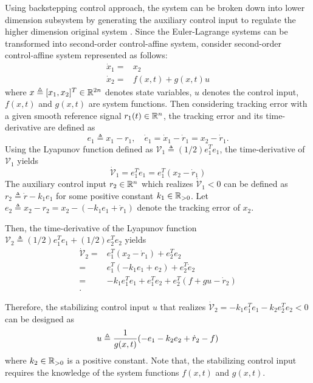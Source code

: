 Using backstepping control approach, the system can be broken down into lower dimension subsystem by generating the auxiliary control input to regulate the higher dimension original system \cite{RN7}.
Since the Euler-Lagrange systems can be transformed into second-order control-affine system, consider second-order control-affine system represented as follows:
\begin{equation}
  \begin{aligned}
    \dot x_1 =& x_2\\
    \dot x_2 =& f(x,t)+g(x,t)u
  \end{aligned}
\end{equation}
where $x\triangleq [x_1,x_2]^T\in\mathbb{R}^{2n}$ denotes state variables, $u$ denotes the control input, $f(x,t)$ and $g(x,t)$ are system functions.
Then considering tracking error with a given smooth reference signal $r_1(t)\in\mathbb{R}^n$, the tracking error and its time-derivative are defined as
\begin{equation}
  e_1\triangleq x_1-r_1,\quad \dot e_1= \dot x_1-\dot r_1=x_2-\dot r_1
  .
\end{equation}
Using the Lyapunov function defined as $\mathcal V_1\triangleq (1/2)e_1^Te_1$, the time-derivative of $\mathcal V_1$ yields
\begin{equation}
  \dot {\mathcal V}_1 =e_1^T\dot e_1=e_1^T(x_2-\dot r_1)
\end{equation}
The auxiliary control input $r_2\in\mathbb{R}^n$ which realizes $\dot{\mathcal V}_1<0$ can be defined as $r_2\triangleq \dot r -k_1e_1$ for some positive constant $k_1\in\mathbb{R}_{>0}$.
Let $e_2\triangleq x_2-r_2=x_2-(-k_1e_1+\dot r_1)$ denote the tracking error of $x_2$.

Then, the time-derivative of the Lyapunov function $\mathcal V_2\triangleq (1/2)e_1^Te_1+(1/2)e_2^Te_2$ yields
\begin{equation}
  \begin{aligned}
    \dot {\mathcal V}_2
    =&
    e_1^T(x_2-\dot r_1)+e_2^Te_2\\
    =&
    e_1^T(-k_1e_1+e_2)+e_2^T\dot e_2\\
    =&
    -k_1e_1^Te_1+e_1^Te_2+e_2^T(f+gu-\dot r_2)\\
    .
  \end{aligned}
\end{equation}

Therefore, the stabilizing control input $u$ that realizes $\dot {\mathcal V}_2=-k_1e_1^Te_1-k_2e_2^Te_2<0$ can be designed as
\begin{equation}
  u\triangleq {1\over g(x,t)} (-e_1 -k_2e_2 +\dot r_2 -f)
\end{equation}
where $k_2\in\mathbb{R}_{>0}$ is a positive constant.
Note that, the stabilizing control input requires the knowledge of the system functions $f(x,t)$ and $g(x,t)$.
 
